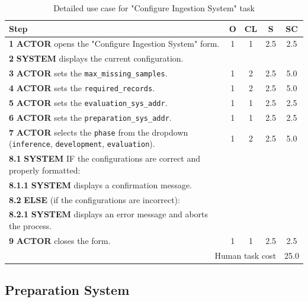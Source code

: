 \begin{table}[H]
    \centering
    \begin{tabularx}{\textwidth}{|X|c|c|c|c|}
    \hline
    \textbf{Step} & \textbf{O} & \textbf{CL} & \textbf{S} & \textbf{SC} \\
    \hline
    \textbf{1} \textbf{ACTOR} opens the "Configure Ingestion System" form. & 1 & 1  & 2.5 & 2.5 \\
    \hline
    \textbf{2} \textbf{SYSTEM} displays the current configuration. &  & &&  \\
    \hline
    \textbf{3} \textbf{ACTOR} sets the \texttt{max\_missing\_samples}. & 1 & 2  & 2.5 & 5.0 \\
    \hline
    \textbf{4} \textbf{ACTOR} sets the \texttt{required\_records}. & 1 & 2  & 2.5 & 5.0 \\
    \hline
    \textbf{5} \textbf{ACTOR} sets the \texttt{evaluation\_sys\_addr}. & 1 & 1  & 2.5 & 2.5 \\
    \hline
    \textbf{6} \textbf{ACTOR} sets the \texttt{preparation\_sys\_addr}. & 1 & 1  & 2.5 & 2.5 \\
    \hline
    \textbf{7} \textbf{ACTOR} selects the \texttt{phase} from the dropdown (\texttt{inference}, \texttt{development}, \texttt{evaluation}). & 1 & 2  & 2.5 & 5.0 \\
    \hline
    \textbf{8.1} \textbf{SYSTEM} IF the configurations are correct and properly formatted: &  &  &  &  \\
    \hline
    \textbf{8.1.1} \textbf{SYSTEM} displays a confirmation message. &  &  &  &  \\
    \hline
    \textbf{8.2} \textbf{ELSE} (if the configurations are incorrect): &  &  &  &  \\
    \hline
    \textbf{8.2.1} \textbf{SYSTEM} displays an error message and aborts the process. &  &  &  &  \\
    \hline
    \textbf{9} \textbf{ACTOR} closes the form. & 1 & 1  & 2.5 & 2.5 \\
    \hline
    \multicolumn{4}{|r|}{Human task cost} & 25.0 \\
    \hline
    \end{tabularx}
    \caption{Detailed use case for "Configure Ingestion System" task}
    \label{table:configure_ingestion_system}
    \end{table} 

\subsection{Preparation System}

